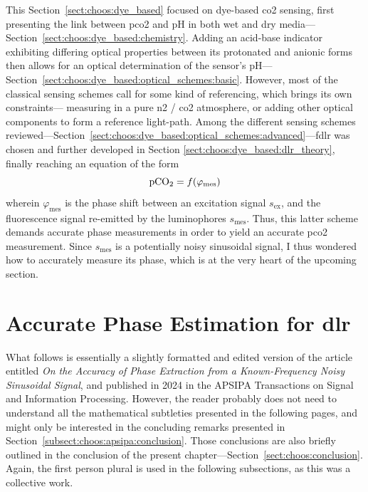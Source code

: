 This Section~\ref{sect:choos:dye_based} focused on dye-based \gls{co2} sensing, first presenting the link between \gls{pco2} and pH in both wet and dry media---Section~\ref{sect:choos:dye_based:chemistry}. Adding an acid-base indicator exhibiting differing optical properties between its protonated and anionic forms then allows for an optical determination of the sensor's pH---Section~\ref{sect:choos:dye_based:optical_schemes:basic}. However, most of the classical sensing schemes call for some kind of referencing, which brings its own constraints---\eg{} measuring in a pure \gls{n2} / \gls{co2} atmosphere, or adding other optical components to form a reference light-path. Among the different sensing schemes reviewed---Section~\ref{sect:choos:dye_based:optical_schemes:advanced}---\gls{fdlr} was chosen and further developed in Section \ref{sect:choos:dye_based:dlr_theory}, finally reaching an equation of the form
\begin{equation}
	\ce{pCO_2} = f(\varphi_\text{mes})
\end{equation}
wherein $\varphi_\text{mes}$ is the phase shift between an excitation signal $s_\text{ex}$, and the fluorescence signal re-emitted by the luminophores $s_\text{mes}$. Thus, this latter scheme demands accurate phase measurements in order to yield an accurate \gls{pco2} measurement. Since $s_\text{mes}$ is a potentially noisy sinusoidal signal, I thus wondered how to accurately measure its phase, which is at the very heart of the upcoming section.

\section{Accurate Phase Estimation for \texorpdfstring{\gls{dlr}}{DLR}}\label{sect:choos:phase_mes}

What follows is essentially a slightly formatted and edited version of the article entitled \textit{On the Accuracy of Phase Extraction from a Known-Frequency Noisy	Sinusoidal Signal}, and published in 2024 in the APSIPA Transactions on Signal and Information Processing\cite{dervieux2024phase}. However, the reader probably does not need to understand all the mathematical subtleties presented in the following pages, and might only be interested in the concluding remarks presented in Section~\ref{subsect:choos:apsipa:conclusion}. Those conclusions are also briefly outlined in the conclusion of the present chapter---Section~\ref{sect:choos:conclusion}. Again, the first person plural is used in the following subsections, as this was a collective work.

